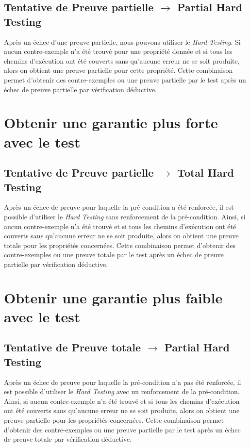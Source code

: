 \subsection{Tentative de Preuve partielle $\rightarrow$ Partial Hard Testing}

Après un échec d'une preuve partielle, nous pouvons utiliser le {\em Hard
Testing}. Si aucun contre-exemple n'a été trouvé pour une propriété donnée et
si tous les chemins d'exécution ont été couverts sans qu'aucune erreur ne se
soit produite, alors on obtient une preuve partielle pour cette propriété.
Cette combinaison permet d'obtenir des contre-exemples ou une preuve partielle
par le test après un échec de preuve partielle par vérification déductive.




\section{Obtenir une garantie plus forte avec le test}

\subsection{Tentative de Preuve partielle $\rightarrow$ Total Hard Testing}

Après un échec de preuve pour laquelle la pré-condition a été renforcée, il est
possible d'utiliser le {\em Hard Testing} sans renforcement de la pré-condition.
Ainsi, si aucun contre-exemple n'a été trouvé et si tous les chemins d'exécution
ont été couverts sans qu'aucune erreur ne se soit produite, alors on obtient une
preuve totale pour les propriétés concernées. Cette combinaison permet d'obtenir
des contre-exemples ou une preuve totale par le test après un échec de preuve
partielle par vérification déductive.




\section{Obtenir une garantie plus faible avec le test}

\subsection{Tentative de Preuve totale $\rightarrow$ Partial Hard Testing}

Après un échec de preuve pour laquelle la pré-condition n'a pas été renforcée,
il est possible d'utiliser le {\em Hard Testing} avec un renforcement de la
pré-condition. Ainsi, si aucun contre-exemple n'a été trouvé et si tous les
chemins d'exécution ont été couverts sans qu'aucune erreur ne se soit produite,
alors on obtient une preuve partielle pour les propriétés concernées. Cette
combinaison permet d'obtenir des contre-exemples ou une preuve partielle par le
test après un échec de preuve totale par vérification déductive.




